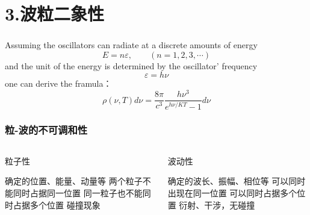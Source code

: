 \section{3.波粒二象性}      

\begin{frame}
    \frametitle{}
    \begin{tcolorbox3}[前情回顾]
        Assuming the oscillators can radiate at a discrete amounts of energy
        \[    E=n\varepsilon, \qquad (n=1,2,3,\cdots) \]
        and the unit of the energy is determined by the oscillator' frequency
        \[   \varepsilon=h\nu  \]
        one can derive the framula：
        \[ \rho(\nu, T) d \nu=\frac{8 \pi}{c^{3}} \frac{h \nu^{3} }{e^{h \nu / K T}-1} d \nu \]
    \end{tcolorbox3}
\end{frame}

\begin{frame}
    \frametitle{粒-波的不可调和性}
	\begin{columns}
		\begin{column}[t]{0.46\linewidth}
			粒子性
			\begin{itemize}
				\Item  确定的位置、能量、动量等
				\Item  两个粒子不能同时占据同一位置
				\Item  同一粒子也不能同时占据多个位置
				\Item  碰撞现象
			\end{itemize}
		\end{column}
		\begin{column}[t]{0.46\linewidth}
			波动性
			\vspace{1ex}
			\begin{itemize}
				\Item  确定的波长、振幅、相位等
				\Item  可以同时出现在同一位置
				\Item  可以同时占据多个位置
				\Item  衍射、干涉，无碰撞
			\end{itemize}
		\end{column}
	\end{columns}
\end{frame}

